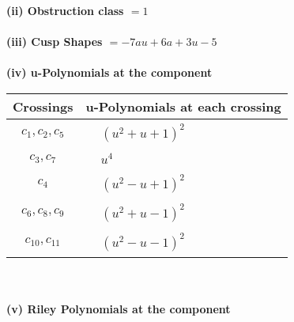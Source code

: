 \documentclass[1p]{elsarticle_modified}
\theoremstyle{definition}
\begin{document}
\flushleft \textbf{(ii) Obstruction class $= 1$}\\~\\
\flushleft \textbf{(iii) Cusp Shapes $= -7 a u+6 a+3 u-5$}\\~\\
\newpage\renewcommand{\arraystretch}{1}
\flushleft \textbf{(iv) u-Polynomials at the component}\newline \\
\begin{tabular}{m{50pt}|m{274pt}}
Crossings & \hspace{64pt}u-Polynomials at each crossing \\
\hline $$\begin{aligned}c_{1},c_{2},c_{5}\end{aligned}$$&$\begin{aligned}
&(u^2+u+1)^2
\end{aligned}$\\
\hline $$\begin{aligned}c_{3},c_{7}\end{aligned}$$&$\begin{aligned}
&u^4
\end{aligned}$\\
\hline $$\begin{aligned}c_{4}\end{aligned}$$&$\begin{aligned}
&(u^2- u+1)^2
\end{aligned}$\\
\hline $$\begin{aligned}c_{6},c_{8},c_{9}\end{aligned}$$&$\begin{aligned}
&(u^2+u-1)^2
\end{aligned}$\\
\hline $$\begin{aligned}c_{10},c_{11}\end{aligned}$$&$\begin{aligned}
&(u^2- u-1)^2
\end{aligned}$\\
\hline
\end{tabular}\\~\\
\newpage\renewcommand{\arraystretch}{1}
\flushleft \textbf{(v) Riley Polynomials at the component}\newline \\
\end{document}
